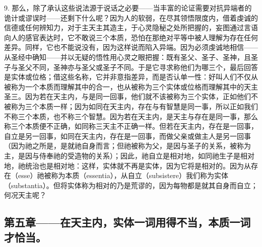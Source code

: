 9. 那么，除了承认这些说法源于说话之必要——当丰富的论证需要对抗异端者的诡计或谬误时——还剩下什么呢？因为人的软弱，在尽其领悟限度内，借着虔诚的信德或任何辨知力，对于主天主其造主，于心灵隐秘之处所把握的，妄图通过言语向人的感官表达时，它不敢说三个本质，恐怕在那绝对平等中被人理解为存在任何差异。同样，它也不能说没有，因为这样说而陷入异端。因为必须虔诚地相信——从圣经中确知——并以无疑的悟性用心灵之眼把握：既有圣父、圣子、圣神，且圣子与圣父不同，圣神亦与圣父或圣子不同。于是它寻求称他们为哪三个，最后回答是实体或位格；借这些名称，它并非意指差异，而是否认单一性：好叫人们不仅从被称为一个本质而理解其中的合一，也从被称为三个实体或位格而理解其中的天主圣三。因为若在天主内，与是同一回事，他们就不该被称为三个实体，正如他们不被称为三个本质一样；因为如同在天主内，存在与有智慧是同一事，所以正如我们不称三个本质，也不称三个智慧。因为若在天主内，是天主与存在是同一事，那么称三个本质便不正确，如同称三天主不正确一样。但若在天主内，存在是一回事，自立是另一回事，如同在天主内，存在是一回事，而做父亲或做主人是另一回事（因为祂之所是，是就祂自身而言；但祂被称为父，是因与圣子的关系，被称为主，是因与侍奉祂的受造物的关系）；因此，祂自立是相对地，如同祂生子是相对地，祂统治也是相对地：这样，实体就不再是实体，因为它将是相对的。因为从存在（esse）祂被称为本质（essentia），从自立（subsistere）我们称为实体（substantia）。但将实体称为相对的乃是荒谬的，因为每物都是就其自身而自立；何况天主呢？\par


\subsection{第五章——在天主内，实体一词用得不当，本质一词才恰当。}

